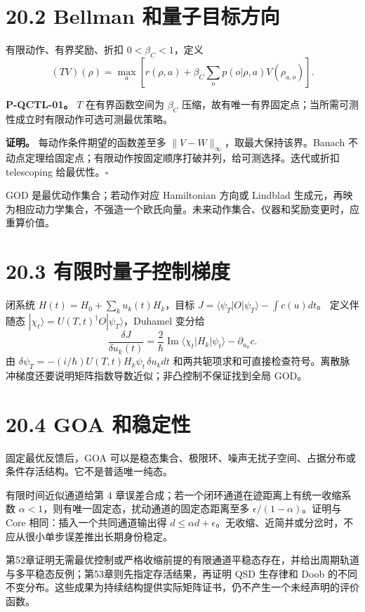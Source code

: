 \documentclass[
  11pt,
  oneside]{book}
\begin{document}
\section{20.2 Bellman 和量子目标方向}

有限动作、有界奖励、折扣 \(0<\beta_C<1\)，定义 \[
(TV)(\rho)=\max_a\left[r(\rho,a)+
\beta_C\sum_op(o|\rho,a)V(\rho_{a,o})\right].
\]

\protect\hypertarget{p-qctl-01}{}{}

\textbf{P-QCTL-01。} \(T\) 在有界函数空间为 \(\beta_C\)
压缩，故有唯一有界固定点；当所需可测性成立时有限动作可选可测最优策略。

\textbf{证明。} 每动作条件期望的函数差至多
\(\|V-W\|_\infty\)，取最大保持该界。Banach
不动点定理给固定点；有限动作按固定顺序打破并列，给可测选择。迭代或折扣
telescoping 给最优性。\(\square\)

GOD 是最优动作集合；若动作对应 Hamiltonian 方向或 Lindblad
生成元，再映为相应动力学集合，不强造一个欧氏向量。未来动作集合、仪器和奖励变更时，应重算价值。

\section{20.3 有限时量子控制梯度}

闭系统 \(H(t)=H_0+\sum_k u_k(t)H_k\)，目标
\(J=\langle\psi_T|O|\psi_T\rangle-\int c(u)dt\)。 定义伴随态
\(|\chi_t\rangle=U(T,t)^\dagger O|\psi_T\rangle\)，Duhamel 变分给 \[
\frac{\delta J}{\delta u_k(t)}
=\frac2\hbar\operatorname{Im}\langle\chi_t|H_k|\psi_t\rangle
-\partial_{u_k}c.
\] 由 \(\delta\psi_T=-(i/\hbar)U(T,t)H_k\psi_t\,\delta u_kdt\)
和两共轭项求和可直接检查符号。离散脉冲梯度还要说明矩阵指数导数近似；非凸控制不保证找到全局
GOD。

\section{20.4 GOA 和稳定性}

固定最优反馈后，GOA
可以是稳态集合、极限环、噪声无扰子空间、占据分布或条件存活结构。它不是普适唯一纯态。

有限时间近似通道给第 4
章误差合成；若一个闭环通道在迹距离上有统一收缩系数
\(\alpha<1\)，则有唯一固定态，扰动通道的固定态距离至多
\(\epsilon/(1-\alpha)\)。证明与 Core 相同：插入一个共同通道输出得
\(d\le\alpha d+\epsilon\)。无收缩、近简并或分岔时，不应从很小单步误差推出长期身份稳定。

第52章证明无需最优控制或严格收缩前提的有限通道平稳态存在，并给出周期轨道与多平稳态反例；第53章则先指定存活结果，再证明
QSD 生存律和 Doob
的不同不变分布。这些成果为持续结构提供实际矩阵证书，仍不产生一个未经声明的评价函数。
\end{document}
